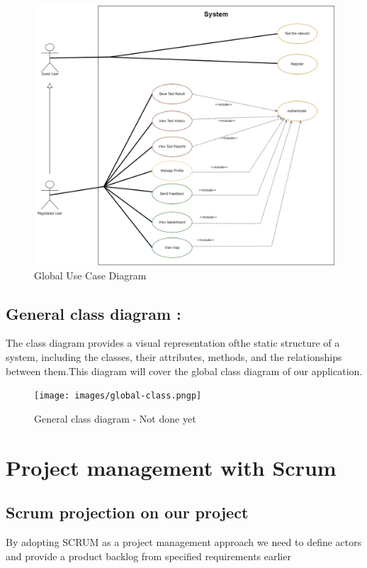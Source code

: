 \begin{figure}[H]
    \centering
    \includegraphics[width=1\textwidth]{images/chap1/gloabalUC.png}
    \caption{Global Use Case Diagram}
    \label{fig:enter-label}
\end{figure}

\newpage

\subsection{General class diagram : }

The class diagram provides a visual representation ofthe static structure of a system, including the classes, their attributes, methods, and the relationships between them.This diagram will cover the global class diagram of our application.
\begin{figure}[H]
    \centering
    \texttt{[image: images/global-class.pngp]}
    \caption{General class diagram - Not done yet}
    \label{fig:enter-label}
\end{figure}




\newpage

\section{Project management with Scrum}

\subsection{Scrum projection on our project}
By adopting SCRUM as a project management approach we need to define actors 
and provide a product backlog from specified requirements earlier 
